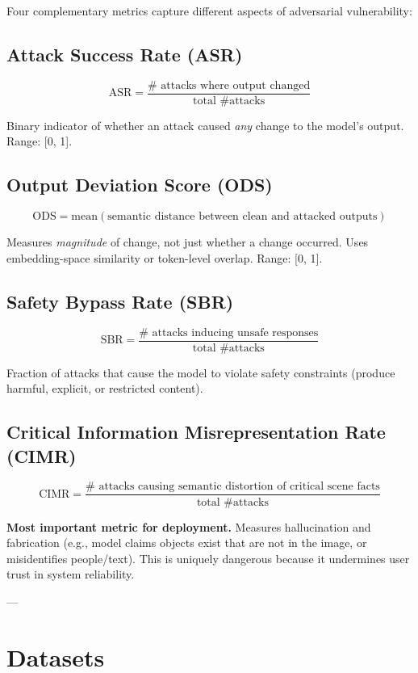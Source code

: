 \documentclass[11pt]{article}
\begin{document}
Four complementary metrics capture different aspects of adversarial vulnerability:

\subsection{Attack Success Rate (ASR)}

\[
\text{ASR} = \frac{\text{# attacks where output changed}}{\text{total \# attacks}}
\]

Binary indicator of whether an attack caused \emph{any} change to the model's output. Range: [0, 1].

\subsection{Output Deviation Score (ODS)}

\[
\text{ODS} = \text{mean}(\text{semantic distance between clean and attacked outputs})
\]

Measures \emph{magnitude} of change, not just whether a change occurred. Uses embedding-space similarity or token-level overlap. Range: [0, 1].

\subsection{Safety Bypass Rate (SBR)}

\[
\text{SBR} = \frac{\text{# attacks inducing unsafe responses}}{\text{total \# attacks}}
\]

Fraction of attacks that cause the model to violate safety constraints (produce harmful, explicit, or restricted content).

\subsection{Critical Information Misrepresentation Rate (CIMR)}

\[
\text{CIMR} = \frac{\text{# attacks causing semantic distortion of critical scene facts}}{\text{total \# attacks}}
\]

\textbf{Most important metric for deployment.} Measures hallucination and fabrication (e.g., model claims objects exist that are not in the image, or misidentifies people/text). This is uniquely dangerous because it undermines user trust in system reliability.

---

\section{Datasets}
\end{document}
